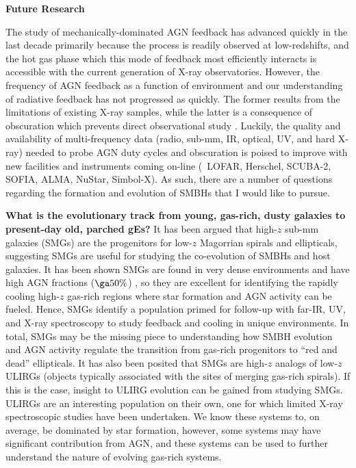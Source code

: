 \documentclass[12pt]{article}
\begin{document}
{\bfseries{Future Research}}

The study of mechanically-dominated AGN feedback has advanced quickly
in the last decade primarily because the process is readily observed
at low-redshifts, and the hot gas phase which this mode of feedback
most efficiently interacts is accessible with the current generation
of X-ray observatories. However, the frequency of AGN feedback as a
function of environment and our understanding of radiative feedback
has not progressed as quickly. The former results from the limitations
of existing X-ray samples, while the latter is a consequence of
obscuration which prevents direct observational study
\cite{2009arXiv0911.3911A}. Luckily, the quality and availability of
multi-frequency data (radio, sub-mm, IR, optical, UV, and hard X-ray)
needed to probe AGN duty cycles and obscuration is poised to improve
with new facilities and instruments coming on-line (\ie\ LOFAR,
Herschel, SCUBA-2, SOFIA, ALMA, NuStar, Simbol-X). As such, there are
a number of questions regarding the formation and evolution of SMBHs
that I would like to pursue.

{\bf{ What is the evolutionary track from young, gas-rich, dusty
    galaxies to present-day old, parched gEs?}} It has been argued
that high-$z$ sub-mm galaxies (SMGs) are the progenitors for low-$z$
Magorrian spirals and ellipticals, suggesting SMGs are useful for
studying the co-evolution of SMBHs and host galaxies. It has been
shown SMGs are found in very dense environments and have high AGN
fractions ($\ga 50\%$) \cite{2005ApJ...632..736A}, so they are
excellent for identifying the rapidly cooling high-$z$ gas-rich
regions where star formation and AGN activity can be fueled. Hence,
SMGs identify a population primed for follow-up with far-IR, UV, and
X-ray spectroscopy to study feedback and cooling in unique
environments. In total, SMGs may be the missing piece to understanding
how SMBH evolution and AGN activity regulate the transition from
gas-rich progenitors to ``red and dead'' ellipticals. It has also been
posited that SMGs are high-$z$ analogs of low-$z$ ULIRGs (objects
typically associated with the sites of merging gas-rich spirals). If
this is the case, insight to ULIRG evolution can be gained from
studying SMGs. ULIRGs are an interesting population on their own, one
for which limited X-ray spectroscopic studies have been undertaken. We
know these systems to, on average, be dominated by star formation,
however, some systems may have significant contribution from AGN, and
these systems can be used to further understand the nature of evolving
gas-rich systems.
\end{document}

